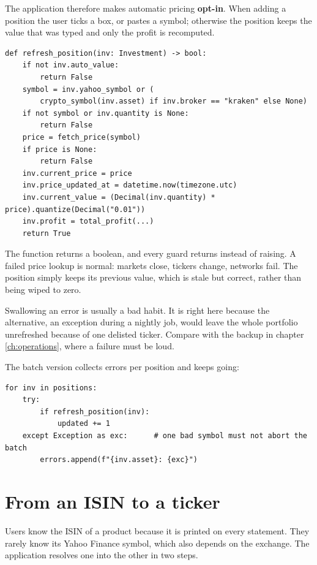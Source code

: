 The application therefore makes automatic pricing \textbf{opt-in}. When adding a
position the user ticks a box, or pastes a symbol; otherwise the position keeps
the value that was typed and only the profit is recomputed.

\begin{lstlisting}[style=py]
def refresh_position(inv: Investment) -> bool:
    if not inv.auto_value:
        return False
    symbol = inv.yahoo_symbol or (
        crypto_symbol(inv.asset) if inv.broker == "kraken" else None)
    if not symbol or inv.quantity is None:
        return False
    price = fetch_price(symbol)
    if price is None:
        return False
    inv.current_price = price
    inv.price_updated_at = datetime.now(timezone.utc)
    inv.current_value = (Decimal(inv.quantity) * price).quantize(Decimal("0.01"))
    inv.profit = total_profit(...)
    return True
\end{lstlisting}

The function returns a boolean, and every guard returns  instead of
raising. A failed price lookup is normal: markets close, tickers change, networks
fail. The position simply keeps its previous value, which is stale but correct,
rather than being wiped to zero.

\begin{pitfall}
Swallowing an error is usually a bad habit. It is right here because the
alternative, an exception during a nightly job, would leave the whole portfolio
unrefreshed because of one delisted ticker. Compare with the backup in chapter
\ref{ch:operations}, where a failure must be loud.
\end{pitfall}

The batch version collects errors per position and keeps going:

\begin{lstlisting}[style=py]
for inv in positions:
    try:
        if refresh_position(inv):
            updated += 1
    except Exception as exc:      # one bad symbol must not abort the batch
        errors.append(f"{inv.asset}: {exc}")
\end{lstlisting}

\section{From an ISIN to a ticker}

Users know the ISIN of a product because it is printed on every statement. They
rarely know its Yahoo Finance symbol, which also depends on the exchange. The
application resolves one into the other in two steps.

